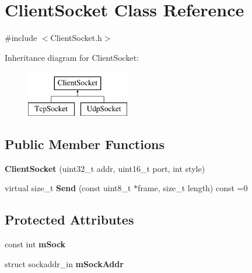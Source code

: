 \hypertarget{class_client_socket}{\section{Client\-Socket Class Reference}
\label{class_client_socket}
}


{\ttfamily \#include $<$Client\-Socket.\-h$>$}

Inheritance diagram for Client\-Socket\-:\begin{figure}[H]
\begin{center}
\leavevmode
\includegraphics[height=2.000000cm]{class_client_socket}
\end{center}
\end{figure}
\subsection*{Public Member Functions}
\begin{DoxyCompactItemize}
\item 
\hypertarget{class_client_socket_a9ef0e9b489c27a59ddcc5b863d70c5c4}{{\bfseries Client\-Socket} (uint32\-\_\-t addr, uint16\-\_\-t port, int style)}\label{class_client_socket_a9ef0e9b489c27a59ddcc5b863d70c5c4}

\item 
\hypertarget{class_client_socket_ad53cfcbf3eebbfb8b8314f58d3354edd}{virtual size\-\_\-t {\bfseries Send} (const uint8\-\_\-t $\ast$frame, size\-\_\-t length) const =0}\label{class_client_socket_ad53cfcbf3eebbfb8b8314f58d3354edd}

\end{DoxyCompactItemize}
\subsection*{Protected Attributes}
\begin{DoxyCompactItemize}
\item 
\hypertarget{class_client_socket_acb5029d09ef913c0b444e97f2cc98bef}{const int {\bfseries m\-Sock}}\label{class_client_socket_acb5029d09ef913c0b444e97f2cc98bef}

\item 
\hypertarget{class_client_socket_acbf9ed9f1ebac9348a2d1c77b516acbc}{struct sockaddr\-\_\-in {\bfseries m\-Sock\-Addr}}\label{class_client_socket_acbf9ed9f1ebac9348a2d1c77b516acbc}

\end{DoxyCompactItemize}


